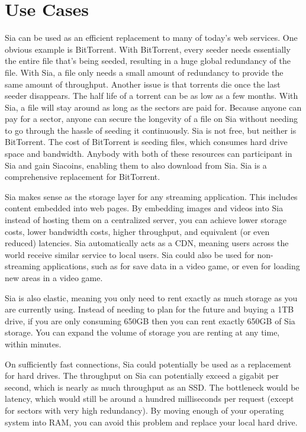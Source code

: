 \documentclass[twocolumn]{article}
\begin{document}
\section{Use Cases}
Sia can be used as an efficient replacement to many of today's web services.
One obvious example is BitTorrent.
With BitTorrent, every seeder needs essentially the entire file that's being seeded, resulting in a huge global redundancy of the file.
With Sia, a file only needs a small amount of redundancy to provide the same amount of throughput.
Another issue is that torrents die once the last seeder disappears.
The half life of a torrent can be as low as a few months.
With Sia, a file will stay around as long as the sectors are paid for.
Because anyone can pay for a sector, anyone can secure the longevity of a file on Sia without needing to go through the hassle of seeding it continuously.
Sia is not free, but neither is BitTorrent.
The cost of BitTorrent is seeding files, which consumes hard drive space and bandwidth.
Anybody with both of these resources can participant in Sia and gain Siacoins, enabling them to also download from Sia.
Sia is a comprehensive replacement for BitTorrent.

Sia makes sense as the storage layer for any streaming application.
This includes content embedded into web pages.
By embedding images and videos into Sia instead of hosting them on a centralized server, you can achieve lower storage costs, lower bandwidth costs, higher throughput, and equivalent (or even reduced) latencies.
Sia automatically acts as a CDN, meaning users across the world receive similar service to local users.
Sia could also be used for non-streaming applications, such as for save data in a video game, or even for loading new areas in a video game.

Sia is also elastic, meaning you only need to rent exactly as much storage as you are currently using.
Instead of needing to plan for the future and buying a 1TB drive, if you are only consuming 650GB then you can rent exactly 650GB of Sia storage.
You can expand the volume of storage you are renting at any time, within minutes.

On sufficiently fast connections, Sia could potentially be used as a replacement for hard drives.
The throughput on Sia can potentially exceed a gigabit per second, which is nearly as much throughput as an SSD.
The bottleneck would be latency, which would still be around a hundred milliseconds per request (except for sectors with very high redundancy).
By moving enough of your operating system into RAM, you can avoid this problem and replace your local hard drive.
\end{document}
